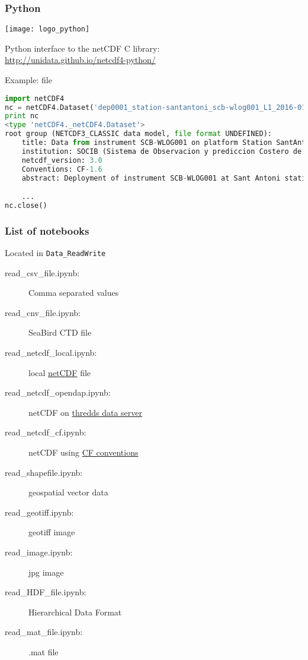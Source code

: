 \begin{frame}[c, fragile]
\frametitle{Python}

\texttt{[image: logo\_python]}

Python interface to the netCDF C library:\\
\url{http://unidata.github.io/netcdf4-python/}

Example: file 
\vfill

\begin{lstlisting}[language=python,basicstyle=\tiny,title=Example with ipython]
import netCDF4
nc = netCDF4.Dataset('dep0001_station-santantoni_scb-wlog001_L1_2016-01.nc')
print nc
<type 'netCDF4._netCDF4.Dataset'>
root group (NETCDF3_CLASSIC data model, file format UNDEFINED):
    title: Data from instrument SCB-WLOG001 on platform Station SantAntoni
    institution: SOCIB (Sistema de Observacion y prediccion Costero de las Islas Baleares)
    netcdf_version: 3.0
    Conventions: CF-1.6
    abstract: Deployment of instrument SCB-WLOG001 at Sant Antoni station in endurance line

    ...
nc.close()
\end{lstlisting}

\end{frame}


\begin{frame}[c, fragile]
\frametitle{List of notebooks}

Located in \verb|Data_ReadWrite|
{
\scriptsize
\begin{description}
\item[read\_csv\_file.ipynb:] Comma separated values
\item[read\_cnv\_file.ipynb:] SeaBird CTD file
\item[]
\item[read\_netcdf\_local.ipynb:] local \href{http://www.unidata.ucar.edu/software/netcdf/}{netCDF} file
\item[read\_netcdf\_opendap.ipynb:] netCDF on \href{http://www.unidata.ucar.edu/software/thredds/current/tds/}{thredds data server}
\item[read\_netcdf\_cf.ipynb:] netCDF using \href{http://cfconventions.org/}{CF conventions}
\item[read\_shapefile.ipynb:] geospatial vector data
\item[]
\item[read\_geotiff.ipynb:] geotiff image
\item[read\_image.ipynb:] jpg image
\item[]
\item[read\_HDF\_file.ipynb:] Hierarchical Data Format
\item[read\_mat\_file.ipynb:] .mat file


\end{description}
}


\end{frame}

